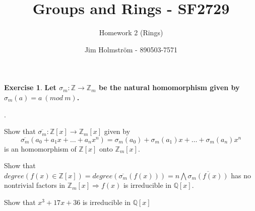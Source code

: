 \documentclass[a4paper,twoside=false,abstract=false,numbers=noenddot,
titlepage=false,headings=small,parskip=half,version=last]{scrartcl}
\author{Jim Holmström - 890503-7571}
\title{Groups and Rings - SF2729}
\subtitle{Homework 2 (Rings)}
\theoremstyle{definition}
\newtheorem{exercise}{Exercise}
\theoremstyle{remark}
\newcommand{\ZZ}{\ensuremath{\mathbb{Z}}}
\newcommand{\QQ}{\ensuremath{\mathbb{Q}}}
\newcounter{qc}
\begin{document}
\maketitle
\thispagestyle{empty}

\begin{exercise}
{\bf
Let $\sigma_m : \ZZ \rightarrow \ZZ_m$ be the natural homomorphism given by
$\sigma_m(a)= a~(mod~m)$.
\begin{list}
{.}
{
    \bfseries
    \setlength{}
}
    \item Show that
    $\overline{\sigma_m}:\ZZ\left[x\right]\rightarrow\ZZ_m\left[x\right]$ given
    by
    \begin{equation}
        \overline{\sigma_m}(a_0+a_1x+\hdots+a_nx^n)=
        \sigma_m(a_0)+\sigma_m(a_1)x+\hdots+\sigma_m(a_n)x^n
    \end{equation}
    is an homomorphism of $\ZZ\left[x\right]$ onto $\ZZ_m\left[x\right]$.
    \item Show that
    $degree(f(x)\in\ZZ\left[x\right])=degree(\overline{\sigma_m}(f(x)))=n
    \bigwedge \overline{\sigma_m(f(x))}$ has no nontrivial factors in
    $\ZZ_m\left[x\right] \Rightarrow f(x)$ is irreducible in $\QQ\left[x\right]$.
    \item Show that $x^3+17x+36$ is irreducible in $\QQ\left[x\right]$
\end{list}
}
\end{exercise}
\end{document}
